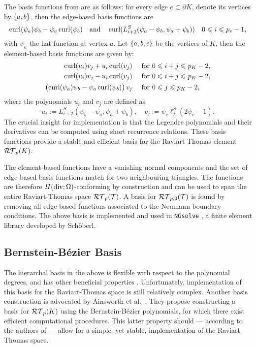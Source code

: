 \documentclass[thesis.tex]{subfiles}
\begin{document}
  The basis functions from \cite{schoberl2005high} are as follows:
  for every edge $e \subset \partial K$, denote its vertices by $\set{a,b}$, then the edge-based basis functions are 
  \begin{align*}
    \operatorname{curl} (\psi_a) \psi_b - \psi_a \operatorname{curl} (\psi_b) \quad \text{and}\quad \operatorname{curl} (L^S_{i+2}(\psi_a - \psi_b, \psi_a + \psi_b)) \quad 0 \leqslant i \leqslant p_e - 1,
  \end{align*}
  with $\psi_a$ the hat function at vertex $a$. Let $\set{a,b,c}$ be the vertices of $K$, then the element-based
  basis functions are given by:
  \begin{align*}
    \operatorname{curl} (u_i) v_j + u_i \operatorname{curl} (v_j) \quad &\text{ for } 0 \leqslant i +j \leqslant p_K -2,\\
    \operatorname{curl} (u_i) v_j - u_i \operatorname{curl} (v_j) \quad &\text{ for } 0 \leqslant i +j  \leqslant p_K - 2,\\
    \left(\operatorname{curl} (\psi_a) \psi_b - \psi_a \operatorname{curl} (\psi_b)\right)v_j\quad & \text{ for } 0 \leqslant j \leqslant p_K - 2,
  \end{align*}
  where the polynomials $u_i$ and $v_j$ are defined as
  \[
    u_i := L^S_{i+2}(\psi_b - \psi_a, \psi_a + \psi_b), \quad v_j := \psi_c \ell^S_j(2\psi_c - 1).
  \]
  The crucial insight for implementation is that the Legendre polynomials and their derivatives can be computed using short recurrence relations. These
  basis functions provide a stable and efficient basis for the Raviart-Thomas element $\mathcal{RT}_p(K)$.

  The element-based functions have a vanishing normal components and the set of edge-based basis functions
  match for two neighbouring triangles.
  The functions are therefore $H(\operatorname{div}; \Omega)$-conforming by construction and can be used to span
  the entire Raviart-Thomas space $\mathcal{RT}_p(\mathcal{T})$. A basis for $\mathcal{RT}_{p,0}(\mathcal{T})$ is found
  by removing all edge-based functions associated to the Neumann boundary conditions.
  The above basis is implemented and used in \texttt{NGsolve} \cite{ngsolve}, a finite element library developed by Sch\"oberl.

  \subsection{Bernstein-B\'ezier Basis}
  The hierarchal basis in the above is flexible with respect to the polynomial degrees, and
  has other beneficial properties \cite{schoberl2005high}. Unfortunately, implementation
  of this basis for the Raviart-Thomas space is still relatively complex. Another basis construction
  is advocated by Ainsworth et al.~\cite{ainsworthbernstein}.
  They propose constructing a basis for $\mathcal{RT}_p(K)$ using the Bernstein-B\'ezier polynomials, for which there exist efficient computational procedures. This latter
  property should --- according to the authors of \cite{ainsworthbernstein} --- allow for a simple, yet stable, implementation of the Raviart-Thomas space.
\end{document}
